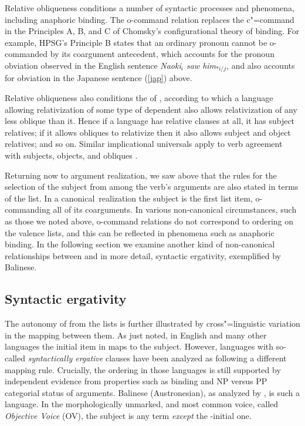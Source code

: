 \documentclass[output=paper
                ,modfonts
                ,nonflat
	        ,collection
	        ,collectionchapter
	        ,collectiontoclongg
 	        ,biblatex
                ,babelshorthands
                ,newtxmath
                ,draftmode
                ,colorlinks, citecolor=brown
]{./langsci/langscibook}
\begin{document}
Relative obliqueness conditions a number of syntactic processes and phenomena, including anaphoric binding.  The o-command relation replaces the c"=command in the Principles A, B, and C of Chomsky's \citeyearpar{Chomsky:1981} configurational theory of binding.  For example, HPSG's Principle B states that an ordinary pronoun cannot be o-commanded by its coargument antecedent, which accounts for the pronoun obviation observed in the English sentence \textit{Naoki$_i$ saw him$_{*i/j}$}, and also accounts for obviation in the Japanese sentence (\ref{jap}) above.  

Relative obliqueness also conditions the  of \citet{KeenanandComrie1977}, according to which a language allowing relativization of some type of dependent also allows relativization of any less oblique than it.  Hence if a language has relative clauses at all, it has subject relatives; if it allows obliques to relativize then it also allows subject and object relatives; and so on.  
Similar implicational universals apply to verb agreement with subjects, objects, and obliques  \citet{greenberg:1966}.  

Returning now to argument realization, we saw above that the rules for the selection of the subject from among the verb's arguments are also stated in terms of the \argst list.  In a canonical\ realization the subject is the first list item, o-commanding all of its coarguments.
In various non-canonical circumstances, such as those we noted above, o-command relations do not correspond to ordering on the valence lists, and this can be reflected in phenomena such as anaphoric binding.
In the following section we examine another kind of non-canonical relationships between \argst and \val in more detail, syntactic ergativity, exemplified by Balinese.

\subsection{Syntactic ergativity}
\label{ergativity}
The autonomy of \argst from the \val lists is further illustrated by cross"=linguistic variation in the mapping between them.  As just noted, in English and many other languages the initial item in \argst maps to the subject.  However,  languages with so-called \emph{syntactically ergative} clauses have been analyzed as following a different mapping rule.  Crucially, the \argst ordering in those languages is still supported by independent evidence from properties such as binding and NP versus PP categorial status of arguments.
Balinese (Austronesian), as analyzed by \citet{Wechsler+Arka:1998}, is such a language.  In the morphologically unmarked, and most common voice, called \emph{Objective Voice} (OV), the subject is any term \textit{except} the \argst-initial one.   
\end{document}
